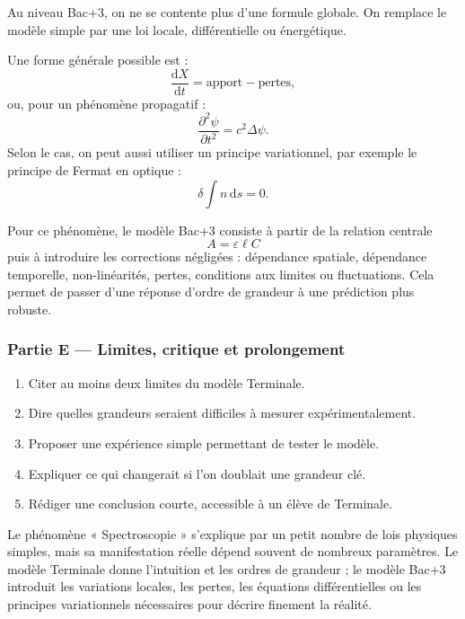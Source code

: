 \documentclass[11pt,a4paper]{article}
\begin{document}
\begin{approfondissementbox}
Au niveau Bac+3, on ne se contente plus d'une formule globale. On remplace le modèle simple par une loi locale, différentielle ou énergétique.

Une forme générale possible est :
\[
\frac{\mathrm d X}{\mathrm dt}=\text{apport}-\text{pertes},
\]
ou, pour un phénomène propagatif :
\[
\frac{\partial^2 \psi}{\partial t^2}=c^2\Delta\psi.
\]
Selon le cas, on peut aussi utiliser un principe variationnel, par exemple le principe de Fermat en optique :
\[
\delta \int n\,\mathrm ds=0.
\]

Pour ce phénomène, le modèle Bac+3 consiste à partir de la relation centrale
\[
A=\varepsilon\ell C
\]
puis à introduire les corrections négligées : dépendance spatiale, dépendance temporelle, non-linéarités, pertes, conditions aux limites ou fluctuations. Cela permet de passer d'une réponse d'ordre de grandeur à une prédiction plus robuste.
\end{approfondissementbox}

\subsubsection*{Partie E — Limites, critique et prolongement}

\begin{enumerate}
  \item Citer au moins deux limites du modèle Terminale.
  \item Dire quelles grandeurs seraient difficiles à mesurer expérimentalement.
  \item Proposer une expérience simple permettant de tester le modèle.
  \item Expliquer ce qui changerait si l'on doublait une grandeur clé.
  \item Rédiger une conclusion courte, accessible à un élève de Terminale.
\end{enumerate}

\begin{corrigebox}
Le phénomène « Spectroscopie » s'explique par un petit nombre de lois physiques simples, mais sa manifestation réelle dépend souvent de nombreux paramètres. Le modèle Terminale donne l'intuition et les ordres de grandeur ; le modèle Bac+3 introduit les variations locales, les pertes, les équations différentielles ou les principes variationnels nécessaires pour décrire finement la réalité.
\end{corrigebox}
\end{document}
